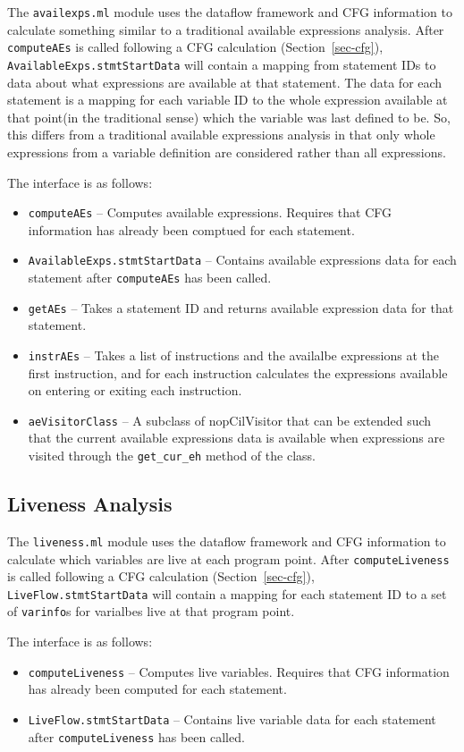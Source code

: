 \documentclass{article}
\def\secref#1{Section~\ref{sec-#1}}
\def\t#1{{\tt #1}}
\begin{document}
The \t{availexps.ml} module uses the dataflow framework and CFG
information to calculate something similar to a traditional available
expressions analysis. After \t{computeAEs} is called following a CFG
calculation (\secref{cfg}), \t{AvailableExps.stmtStartData} will
contain a mapping
from statement IDs to data about what expressions are available at
that statement. The data for each statement is a mapping for each
variable ID to the whole expression available at that point(in the
traditional sense) which the variable was last defined to be. So,
this differs from a traditional available expressions analysis in that
only whole expressions from a variable definition are considered rather
than all expressions.

The interface is as follows:
\begin{itemize}
\item \t{computeAEs} -- Computes available expressions. Requires
that CFG information has already been comptued for each statement.
\item \t{AvailableExps.stmtStartData} -- Contains available
expressions data for each statement after \t{computeAEs} has been
called.
\item \t{getAEs} -- Takes a statement ID and returns
available expression data for that statement.
\item \t{instrAEs} -- Takes a list of instructions and
the availalbe expressions at the first instruction, and
for each instruction calculates the expressions available
on entering or exiting each instruction.
\item \t{aeVisitorClass} -- A subclass of nopCilVisitor that
can be extended such that the current available expressions
data is available when expressions are visited through the
\t{get\_cur\_eh} method of the class.
\end{itemize}

\subsection{Liveness Analysis}

The \t{liveness.ml} module uses the dataflow framework and
CFG information to calculate which variables are live at
each program point. After \t{computeLiveness} is called
following a CFG calculation (\secref{cfg}), \t{LiveFlow.stmtStartData} will
contain a mapping for each statement ID to a set of \t{varinfo}s
for varialbes live at that program point.

The interface is as follows:
\begin{itemize}
\item \t{computeLiveness} -- Computes live variables. Requires
that CFG information has already been computed for each statement.
\item \t{LiveFlow.stmtStartData} -- Contains live variable data
for each statement after \t{computeLiveness} has been called.
\end{itemize}
\end{document}

